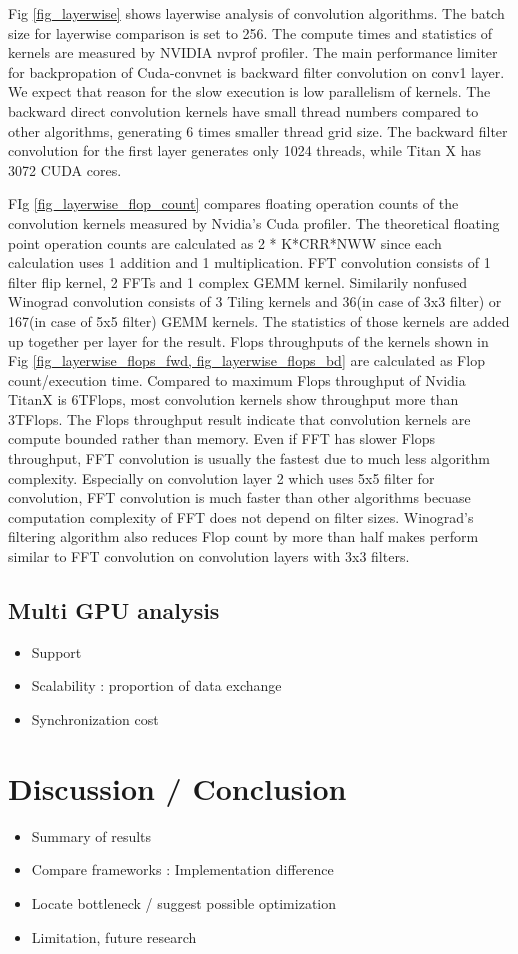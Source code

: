 Fig \ref{fig_layerwise} shows layerwise analysis of convolution algorithms.
The batch size for layerwise comparison is set to 256.
The compute times and statistics of kernels are measured by NVIDIA nvprof profiler.
The main performance limiter for backpropation of Cuda-convnet is backward filter convolution on conv1 layer.
We expect that reason for the slow execution is low parallelism of kernels.
The backward direct convolution kernels have small thread numbers compared to other algorithms, generating 6 times smaller thread grid size.
The backward filter convolution for the first layer generates only 1024 threads, while Titan X has 3072 CUDA cores.

FIg \ref{fig_layerwise_flop_count} compares floating operation counts of the convolution kernels measured by Nvidia's Cuda profiler.
The theoretical floating point operation counts are calculated as 2 * K*CRR*NWW since each calculation uses 1 addition and 1 multiplication.
FFT convolution consists of 1 filter flip kernel, 2 FFTs and 1 complex GEMM kernel.
Similarily nonfused Winograd convolution consists of 3 Tiling kernels and 36(in case of 3x3 filter) or 167(in case of 5x5 filter) GEMM kernels.
The statistics of those kernels are added up together per layer for the result.
Flops throughputs of the kernels shown in Fig \ref{fig_layerwise_flops_fwd, fig_layerwise_flops_bd} are calculated as Flop count/execution time.
Compared to maximum Flops throughput of Nvidia TitanX is 6TFlops, most convolution kernels show throughput more than 3TFlops.
The Flops throughput result indicate that convolution kernels are compute bounded rather than memory.
Even if FFT has slower Flops throughput, FFT convolution is usually the fastest due to much less algorithm complexity.
Especially on convolution layer 2 which uses 5x5 filter for convolution, FFT convolution is much faster than other algorithms becuase computation complexity of FFT does not depend on filter sizes.
Winograd's filtering algorithm also reduces Flop count by more than half makes perform similar to FFT convolution on convolution layers with 3x3 filters.







\subsection{Multi GPU analysis}

\begin{itemize}
  \item Support
  \item Scalability : proportion of data exchange
  \item Synchronization cost
\end{itemize}

\section{Discussion / Conclusion}

\begin{itemize}
  \item Summary of results
  \item Compare frameworks : Implementation difference
  \item Locate bottleneck / suggest possible optimization
  \item Limitation, future research
\end{itemize}

